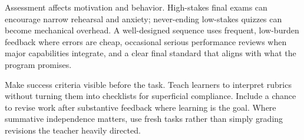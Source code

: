 Assessment affects motivation and behavior. High-stakes final exams can encourage narrow rehearsal and anxiety; never-ending low-stakes quizzes can become mechanical overhead. A well-designed sequence uses frequent, low-burden feedback where errors are cheap, occasional serious performance reviews when major capabilities integrate, and a clear final standard that aligns with what the program promises.

Make success criteria visible before the task. Teach learners to interpret rubrics without turning them into checklists for superficial compliance. Include a chance to revise work after substantive feedback where learning is the goal. Where summative independence matters, use fresh tasks rather than simply grading revisions the teacher heavily directed.
